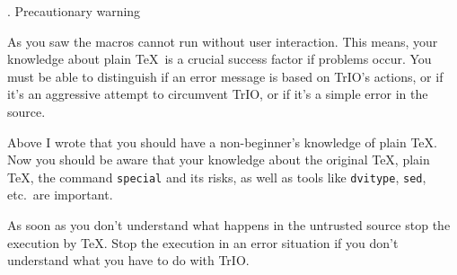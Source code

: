 . Precautionary warning

As you saw the macros cannot run without user interaction. This means,
your knowledge about plain \TeX\ is a crucial success factor if
problems occur. You must be able to distinguish if an error message is
based on TrIO's actions, or if it's an aggressive attempt to
circumvent TrIO, or if it's a simple error in the source.

Above I wrote that you should have a non-beginner's knowledge of
plain \TeX. Now you should be aware that your knowledge about the
original \TeX, plain \TeX, the command {\tt\bs special} and its risks,
as well as tools like {\tt dvitype}, {\tt sed}, etc.\ are important.

As soon as you don't understand what happens in the untrusted source
stop the execution by \TeX. Stop the execution in an error situation
if you don't understand what you have to do with TrIO.

\bye
